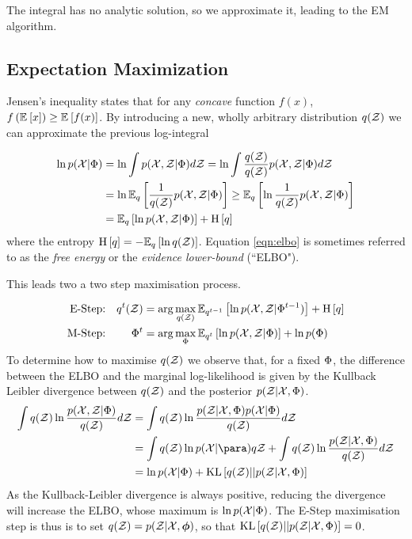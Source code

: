 The integral has no analytic solution, so we approximate it, leading to the EM algorithm.
\subsection{Expectation Maximization}
Jensen's inequality states that for any \emph{concave} function $f(x)$, $f\left(\ex{x}{}\right) \geq \ex{f(x)}{}$. By introducing a new, wholly arbitrary distribution $q(\zdat)$ we can approximate the previous log-integral

\begin{align}
 \ln p(\xdat|\params) & = \ln \int \joint d\zdat =  \ln \int \frac{q(\zdat)}{q(\zdat)} \joint d\zdat\\ 
     &=  \ln \ex{\oneover{q(\zdat)}\joint}{q} \geq  \ex{\ln \oneover{q(\zdat)}\joint}{q}\\
     &= \ex{\ln \joint}{q} + \ent{q} \label{eqn:elbo}
\end{align}
where the entropy $\ent{q} = -\ex{\ln q(\zdat)}{q}$. Equation \eqref{eqn:elbo} is sometimes referred to as the \emph{free energy} or the \emph{evidence lower-bound} (``ELBO").

This leads two a two step maximisation process.

\begin{align}
\text{E-Step:} & & q^t(\zdat) & = \arg \max_{q(\zdat)} \ex{\ln p(\xdat, \zdat|\params^{t-1})}{q^{t-1}} + \ent{q} \label{eqn:estep} \\
\text{M-Step:} & & \params^t & = \arg \max_{\params} \ex{\ln \joint}{q^{t}} + \ln p(\params) \label{eqn:mstep}
\end{align}
To determine how to maximise $q(\zdat)$ we observe that, for a fixed $\params$, the difference between the ELBO and the marginal log-likelihood is given by
 the Kullback Leibler divergence between $q(\zdat)$ and the posterior $p(\zdat|\xdat, \params)$.
\begin{align}
\int q(\zdat) \ln \frac{p(\xdat, \zdat|\params)}{q(\zdat)} d\zdat
& = \int q(\zdat) \ln \frac{p(\zdat|\xdat, \params)p(\xdat | \params)}{q(\zdat)} d\zdat \\
& = \int q(\zdat) \ln p(\xdat | \para) q\zdat + \int q(\zdat)\ln\frac{p(\zdat|\xdat, \params)}{q(\zdat)} d\zdat \\
& = \ln p(\xdat | \params) + \kl{q(\zdat)}{p(\zdat|\xdat, \params)}
\end{align}
As the Kullback-Leibler divergence is always positive, reducing the divergence will increase the ELBO, whose maximum is $\ln p(\xdat | \params)$. The E-Step maximisation step is thus is to set $q(\zdat) = p(\zdat | \xdat, \param)$, so that $\kl{q(\zdat)}{p(\zdat|\xdat, \params)} = 0$.

